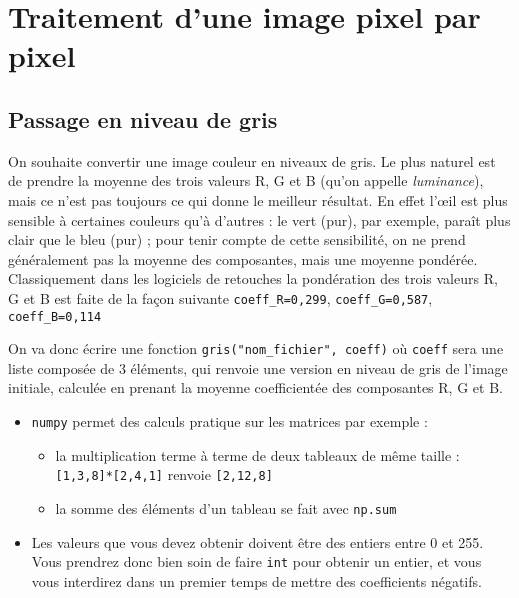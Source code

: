 \documentclass[10pt,a4paper,pdftex]{book}
\begin{document}
 


\section{Traitement d'une image pixel par pixel}

\subsection{Passage en niveau de gris}

\begin{exoc}{}

On souhaite convertir une image couleur en niveaux de gris. Le plus \og naturel \fg{} est de prendre la moyenne des trois valeurs R, G et B (qu'on appelle \textit{luminance}), mais ce n'est pas toujours ce qui donne le meilleur résultat. En effet l'\oe il est plus sensible à certaines couleurs qu'à d'autres : le vert (pur), par exemple, paraît plus clair que le bleu (pur) ; pour tenir compte de cette sensibilité, on ne prend généralement pas la moyenne des composantes, mais une moyenne pondérée. Classiquement dans les logiciels de retouches la pondération des trois valeurs R, G et B  est faite de la façon suivante  \texttt{coeff\_R=0,299}, \texttt{coeff\_G=0,587}, \texttt{coeff\_B=0,114}

\smallskip
On va donc écrire une fonction \verb!gris("nom_fichier", coeff)! où \verb!coeff! sera une liste composée de 3 éléments, qui renvoie une version en niveau de gris de l'image initiale, calculée en prenant la moyenne coefficientée des composantes R, G et B. 

\Rqs 
\begin{itemize}
\item \texttt{numpy} permet des calculs pratique sur les matrices par exemple :
\begin{itemize}
\item la multiplication terme à terme de deux tableaux de même taille : \texttt{[1,3,8]*[2,4,1]} renvoie \texttt{[2,12,8]}
\item la somme des éléments d'un tableau se fait avec \texttt{np.sum}
\end{itemize}
\item Les valeurs que vous devez obtenir doivent être des entiers entre 0 et 255. Vous prendrez donc bien soin de faire \texttt{int} pour obtenir un entier, et vous vous interdirez dans un premier temps de mettre des coefficients négatifs.
\end{itemize}


\end{exoc}
\end{document}
